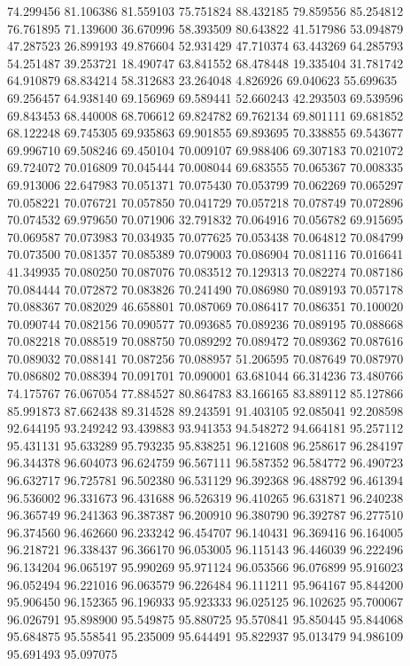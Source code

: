 74.299456
81.106386
81.559103
75.751824
88.432185
79.859556
85.254812
76.761895
71.139600
36.670996
58.393509
80.643822
41.517986
53.094879
47.287523
26.899193
49.876604
52.931429
47.710374
63.443269
64.285793
54.251487
39.253721
18.490747
63.841552
68.478448
19.335404
31.781742
64.910879
68.834214
58.312683
23.264048
4.826926
69.040623
55.699635
69.256457
64.938140
69.156969
69.589441
52.660243
42.293503
69.539596
69.843453
68.440008
68.706612
69.824782
69.762134
69.801111
69.681852
68.122248
69.745305
69.935863
69.901855
69.893695
70.338855
69.543677
69.996710
69.508246
69.450104
70.009107
69.988406
69.307183
70.021072
69.724072
70.016809
70.045444
70.008044
69.683555
70.065367
70.008335
69.913006
22.647983
70.051371
70.075430
70.053799
70.062269
70.065297
70.058221
70.076721
70.057850
70.041729
70.057218
70.078749
70.072896
70.074532
69.979650
70.071906
32.791832
70.064916
70.056782
69.915695
70.069587
70.073983
70.034935
70.077625
70.053438
70.064812
70.084799
70.073500
70.081357
70.085389
70.079003
70.086904
70.081116
70.016641
41.349935
70.080250
70.087076
70.083512
70.129313
70.082274
70.087186
70.084444
70.072872
70.083826
70.241490
70.086980
70.089193
70.057178
70.088367
70.082029
46.658801
70.087069
70.086417
70.086351
70.100020
70.090744
70.082156
70.090577
70.093685
70.089236
70.089195
70.088668
70.082218
70.088519
70.088750
70.089292
70.089472
70.089362
70.087616
70.089032
70.088141
70.087256
70.088957
51.206595
70.087649
70.087970
70.086802
70.088394
70.091701
70.090001
63.681044
66.314236
73.480766
74.175767
76.067054
77.884527
80.864783
83.166165
83.889112
85.127866
85.991873
87.662438
89.314528
89.243591
91.403105
92.085041
92.208598
92.644195
93.249242
93.439883
93.941353
94.548272
94.664181
95.257112
95.431131
95.633289
95.793235
95.838251
96.121608
96.258617
96.284197
96.344378
96.604073
96.624759
96.567111
96.587352
96.584772
96.490723
96.632717
96.725781
96.502380
96.531129
96.392368
96.488792
96.461394
96.536002
96.331673
96.431688
96.526319
96.410265
96.631871
96.240238
96.365749
96.241363
96.387387
96.200910
96.380790
96.392787
96.277510
96.374560
96.462660
96.233242
96.454707
96.140431
96.369416
96.164005
96.218721
96.338437
96.366170
96.053005
96.115143
96.446039
96.222496
96.134204
96.065197
95.990269
95.971124
96.053566
96.076899
95.916023
96.052494
96.221016
96.063579
96.226484
96.111211
95.964167
95.844200
95.906450
96.152365
96.196933
95.923333
96.025125
96.102625
95.700067
96.026791
95.898900
95.549875
95.880725
95.570841
95.850445
95.844068
95.684875
95.558541
95.235009
95.644491
95.822937
95.013479
94.986109
95.691493
95.097075
